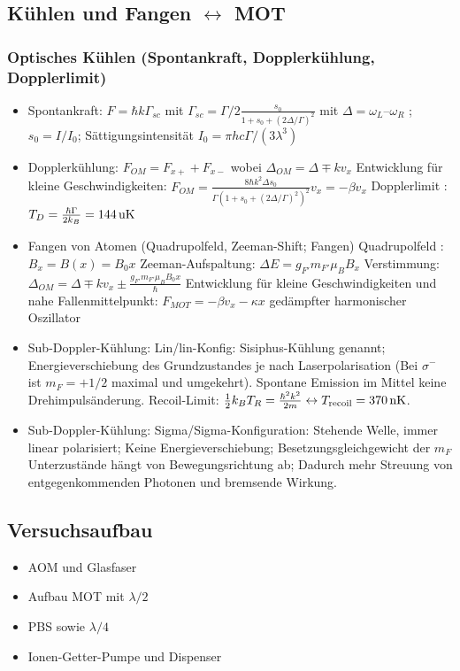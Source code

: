 \documentclass[10pt,a4paper]{extarticle}
\begin{document}
\subsection*{Kühlen und Fangen $\leftrightarrow$ MOT}
\subsubsection*{Optisches Kühlen (Spontankraft, Dopplerkühlung, Dopplerlimit)}
\begin{itemize}
\item Spontankraft: $F = \hbar k \Gamma_{sc}$ mit $\Gamma_{sc} =  \Gamma/2 \frac{s_0}{1+s_0+(2\Delta/\Gamma)^2}$ mit $\Delta = \omega_L – \omega_R$ ; $s_0= I/I_0$; Sättigungsintensität $I_0=\pi h c \Gamma/(3\lambda^3)$
\item Dopplerkühlung: $F_{OM} = F_{x+} + F_{x-}$ wobei $\Delta_{OM} = \Delta \mp k v_x$
Entwicklung für kleine Geschwindigkeiten: $F_{OM} = \frac{8 \hbar k^2 \Delta s_0}{\Gamma (1+s_0 + (2 \Delta/\Gamma)^2)^2} v_x = -\beta v_x $
Dopplerlimit : $T_D = \frac{\hbar \Gamma}{2 k_B} = \unit[144]{uK}$
\item Fangen von Atomen (Quadrupolfeld, Zeeman-Shift; Fangen)
Quadrupolfeld :  $B_x = B(x) = B_0 x$
Zeeman-Aufspaltung: $\Delta E = g_{F'} m_{F'} \mu_B B_x$
Verstimmung: $\Delta_{OM} = \Delta \mp k v_x \pm \frac{g_{F'} m_{F'} \mu_B B_0 x}{\hbar}$
Entwicklung für kleine Geschwindigkeiten und nahe Fallenmittelpunkt: $F_{MOT} = - \beta v_x - \kappa x$ gedämpfter harmonischer Oszillator
\item Sub-Doppler-Kühlung: Lin/lin-Konfig: Sisiphus-Kühlung genannt; Energieverschiebung des Grundzustandes je nach Laserpolarisation (Bei $\sigma^-$ ist $m_F=+1/2$ maximal und umgekehrt). Spontane Emission im Mittel keine Drehimpulsänderung. Recoil-Limit: $\frac{1}{2} k_B T_R = \frac{\hbar^2 k^2}{2m} \leftrightarrow T_{\mathrm{recoil}} = \unit[370]{nK}$.
\item Sub-Doppler-Kühlung: Sigma/Sigma-Konfiguration: Stehende Welle, immer linear polarisiert; Keine Energieverschiebung; Besetzungsgleichgewicht der $m_F$ Unterzustände hängt von Bewegungsrichtung ab; Dadurch mehr Streuung von entgegenkommenden Photonen und bremsende Wirkung.

\end{itemize}

\subsection*{Versuchsaufbau}
\begin{itemize}
\item AOM und Glasfaser
\item Aufbau MOT mit $\lambda/2$
\item PBS sowie $\lambda/4$
\item Ionen-Getter-Pumpe und Dispenser
\end{itemize}
\end{document}

